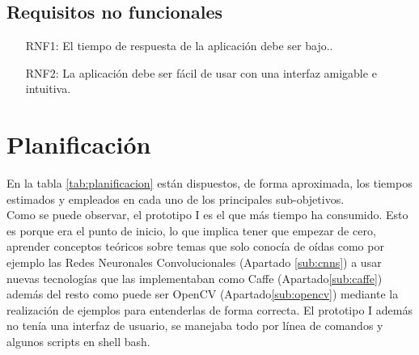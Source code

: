 \documentclass[a4paper,11pt]{book}
\begin{document}
\subsection{Requisitos no funcionales}
\begin{itemize}
	\item [RNF1:] El tiempo de respuesta de la aplicación debe ser bajo..
	\item [RNF2:] La aplicación debe ser fácil de usar con una interfaz amigable e intuitiva.	
\end{itemize}

\section{Planificación}



En la tabla \ref{tab:planificacion} están dispuestos, de forma aproximada, los tiempos estimados y empleados en cada uno de los principales sub-objetivos. \\
Como se puede observar, el prototipo I es el que más tiempo ha consumido. Esto es porque era el punto de inicio, lo que implica tener que empezar de cero, aprender conceptos teóricos sobre temas que solo conocía de oídas como por ejemplo las Redes Neuronales Convolucionales (Apartado \ref{sub:cnns}) a usar nuevas tecnologías que las implementaban como Caffe (Apartado\ref{sub:caffe}) además del resto como puede ser OpenCV (Apartado\ref{sub:opencv}) mediante la realización de ejemplos para entenderlas de forma correcta. El prototipo I además no tenía una interfaz de usuario, se manejaba todo por línea de comandos y algunos scripts en shell bash.\\
\end{document}
